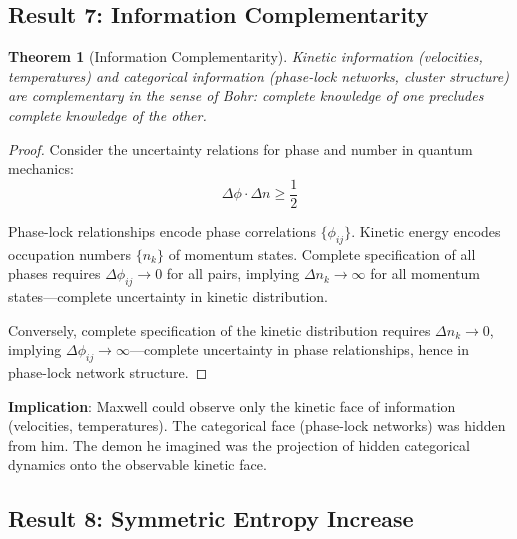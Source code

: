 \documentclass[twocolumn,showpacs,preprintnumbers,amsmath,amssymb,prd]{revtex4-2}
\newtheorem{theorem}{Theorem}[section]
\theoremstyle{definition}
\theoremstyle{remark}
\begin{document}
\subsection{Result 7: Information Complementarity}

\begin{theorem}[Information Complementarity]
\label{thm:complementarity}
Kinetic information (velocities, temperatures) and categorical information (phase-lock networks, cluster structure) are complementary in the sense of Bohr: complete knowledge of one precludes complete knowledge of the other.
\end{theorem}

\begin{proof}
Consider the uncertainty relations for phase and number in quantum mechanics:
\begin{equation}
\Delta \phi \cdot \Delta n \geq \frac{1}{2}
\end{equation}

Phase-lock relationships encode phase correlations $\{\phi_{ij}\}$. Kinetic energy encodes occupation numbers $\{n_k\}$ of momentum states. Complete specification of all phases requires $\Delta \phi_{ij} \to 0$ for all pairs, implying $\Delta n_k \to \infty$ for all momentum states---complete uncertainty in kinetic distribution.

Conversely, complete specification of the kinetic distribution requires $\Delta n_k \to 0$, implying $\Delta \phi_{ij} \to \infty$---complete uncertainty in phase relationships, hence in phase-lock network structure.
\end{proof}

\textbf{Implication}: Maxwell could observe only the kinetic face of information (velocities, temperatures). The categorical face (phase-lock networks) was hidden from him. The demon he imagined was the projection of hidden categorical dynamics onto the observable kinetic face.

\subsection{Result 8: Symmetric Entropy Increase}
\end{document}
